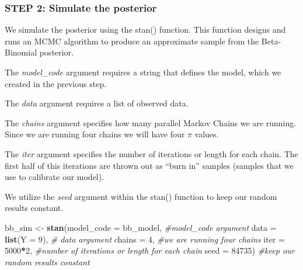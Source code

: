 \documentclass[
]{article}
\newenvironment{Shaded}{\begin{snugshade}}{\end{snugshade}}
\newcommand{\CommentTok}[1]{\textcolor[rgb]{0.56,0.35,0.01}{\textit{#1}}}
\newcommand{\DataTypeTok}[1]{\textcolor[rgb]{0.13,0.29,0.53}{#1}}
\newcommand{\DecValTok}[1]{\textcolor[rgb]{0.00,0.00,0.81}{#1}}
\newcommand{\KeywordTok}[1]{\textcolor[rgb]{0.13,0.29,0.53}{\textbf{#1}}}
\newcommand{\NormalTok}[1]{#1}
\newcommand{\OperatorTok}[1]{\textcolor[rgb]{0.81,0.36,0.00}{\textbf{#1}}}
\newcommand{\StringTok}[1]{\textcolor[rgb]{0.31,0.60,0.02}{#1}}
\begin{document}
\hypertarget{step-2-simulate-the-posterior}{%
\subsubsection{STEP 2: Simulate the
posterior}\label{step-2-simulate-the-posterior}}

We simulate the posterior using the stan() function. This function
designs and runs an MCMC algorithm to produce an approximate sample from
the Beta-Binomial posterior.

The \emph{model\_code} argument requires a string that defines the
model, which we created in the previous step.

The \emph{data} argument requires a list of observed data.

The \emph{chains} argument specifies how many parallel Markov Chains we
are running. Since we are running four chains we will have four \(\pi\)
values.

The \emph{iter} argument specifies the number of iterations or length
for each chain. The first half of this iterations are thrown out as
``burn in'' samples (samples that we use to calibrate our model).

We utilize the \emph{seed} argument within the stan() function to keep
our random results constant.

\begin{Shaded}
\begin{Highlighting}[]
\NormalTok{bb_sim <-}\StringTok{ }\KeywordTok{stan}\NormalTok{(}\DataTypeTok{model_code =}\NormalTok{ bb_model, }\CommentTok{#model_code argument}
               \DataTypeTok{data =} \KeywordTok{list}\NormalTok{(}\DataTypeTok{Y =} \DecValTok{9}\NormalTok{),  }\CommentTok{# data argument}
               \DataTypeTok{chains =} \DecValTok{4}\NormalTok{, }\CommentTok{#we are running four chains}
               \DataTypeTok{iter =} \DecValTok{5000}\OperatorTok{*}\DecValTok{2}\NormalTok{, }\CommentTok{#number of iterations or length for each chain}
               \DataTypeTok{seed =} \DecValTok{84735}\NormalTok{) }\CommentTok{#keep our random results constant}
\end{Highlighting}
\end{Shaded}
\end{document}

